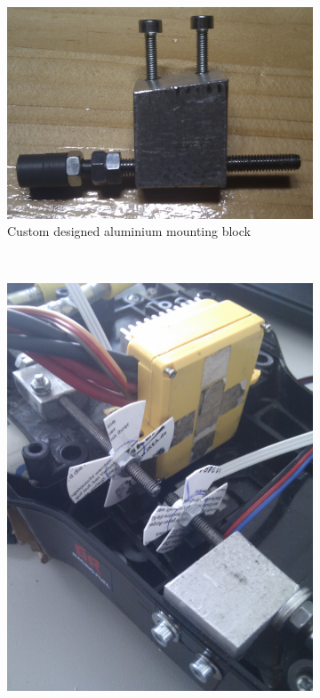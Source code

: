 \documentclass[a4paper
               ,10pt
               ,DIV=10 %
               ,BCOR=0.3cm
               ,pagesize %
               ,headings=small
               ,bibtotoc
               ]
               {scrartcl}
\begin{document}
\begin{figure}[H]
  \centering
  \begin{subfigure}[b]{0.3\textwidth}
  \centering
  \includegraphics[width=\textwidth]{pic/encoder_mount.png}
  \caption{Custom designed aluminium mounting block}
  \label{figencmount1}
  \end{subfigure}~
  \begin{subfigure}[b]{0.3\textwidth}
  \centering
  \includegraphics[width=\textwidth]{pic/encoders_scheiben.jpg}

\end{subfigure}
\end{figure}
\end{document}
